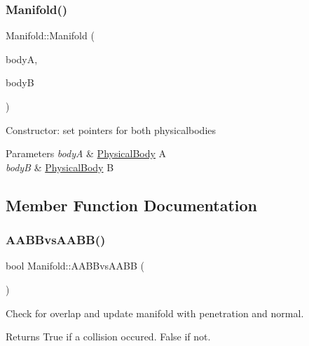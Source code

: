 \subsubsection{\texorpdfstring{Manifold()}{Manifold()}}
{\footnotesize\ttfamily Manifold\+::\+Manifold (\begin{DoxyParamCaption}\item[{\mbox{\hyperlink{class_physical_body}{Physical\+Body}}}]{bodyA,  }\item[{\mbox{\hyperlink{class_physical_body}{Physical\+Body}}}]{bodyB }\end{DoxyParamCaption})}



Constructor\+: set pointers for both physicalbodies 


\begin{DoxyParams}{Parameters}
{\em bodyA} & \mbox{\hyperlink{class_physical_body}{Physical\+Body}} A\\
\hline
{\em bodyB} & \mbox{\hyperlink{class_physical_body}{Physical\+Body}} B\\
\hline
\end{DoxyParams}


\subsection{Member Function Documentation}
\mbox{\label{class_manifold_a09f7dd163c965856905247bb15a1ee99}} 
\subsubsection{\texorpdfstring{A\+A\+B\+Bvs\+A\+A\+B\+B()}{AABBvsAABB()}}
{\footnotesize\ttfamily bool Manifold\+::\+A\+A\+B\+Bvs\+A\+A\+BB (\begin{DoxyParamCaption}{ }\end{DoxyParamCaption})}



Check for overlap and update manifold with penetration and normal. 

\begin{DoxyReturn}{Returns}
True if a collision occured. False if not.
\end{DoxyReturn}
\mbox{\label{class_manifold_a27080a445e565949f9e15b8fea69f6c0}} 
